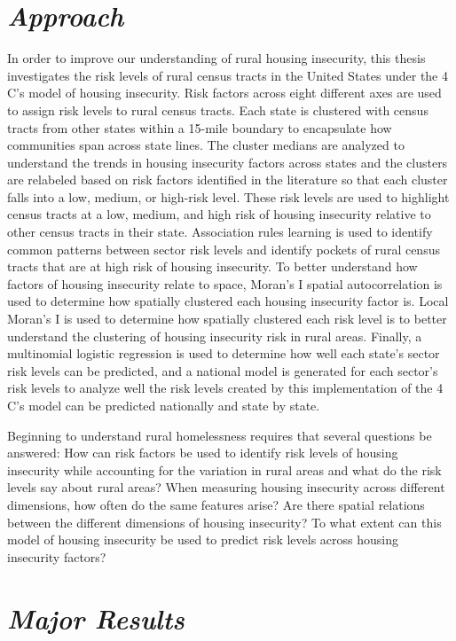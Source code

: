 \section{\textit{Approach}}
In order to improve our understanding of rural housing insecurity, this thesis investigates the risk levels of rural census tracts in the United States under the 4 C's model of housing insecurity. Risk factors across eight different axes are used to assign risk levels to rural census tracts. Each state is clustered with census tracts from other states within a 15-mile boundary to encapsulate how communities span across state lines. The cluster medians are analyzed to understand the trends in housing insecurity factors across states and the clusters are relabeled based on risk factors identified in the literature so that each cluster falls into a low, medium, or high-risk level. These risk levels are used to highlight census tracts at a low, medium, and high risk of housing insecurity relative to other census tracts in their state. Association rules learning is used to identify common patterns between sector risk levels and identify pockets of rural census tracts that are at high risk of housing insecurity. To better understand how factors of housing insecurity relate to space, Moran's I spatial autocorrelation is used to determine how spatially clustered each housing insecurity factor is. Local Moran's I is used to determine how spatially clustered each risk level is to better understand the clustering of housing insecurity risk in rural areas. Finally, a multinomial logistic regression is used to determine how well each state's sector risk levels can be predicted, and a national model is generated for each sector's risk levels to analyze well the risk levels created by this implementation of the 4 C's model can be predicted nationally and state by state. 

Beginning to understand rural homelessness requires that several questions be answered: How can risk factors be used to identify risk levels of housing insecurity while accounting for the variation in rural areas and what do the risk levels say about rural areas? When measuring housing insecurity across different dimensions, how often do the same features arise? Are there spatial relations between the different dimensions of housing insecurity? To what extent can this model of housing insecurity be used to predict risk levels across housing insecurity factors?

\section{\textit{Major Results}}

